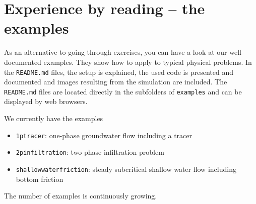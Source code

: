\section{Experience \Dumux by reading -- the \Dumux examples}
As an alternative to going through exercises, you can have a look at our well-documented \Dumux examples. They show how to apply \Dumux to typical physical problems. In the \texttt{README.md} files, the setup is explained, the used code is presented and documented and images resulting from the simulation are included. The \texttt{README.md} files are located directly in the subfolders of \texttt{examples} and can be displayed by web browsers.

We currently have the examples
\begin{itemize}
	\item \texttt{1ptracer}: one-phase groundwater flow including a tracer
	\item \texttt{2pinfiltration}: two-phase infiltration problem
	\item \texttt{shallowwaterfriction}: steady subcritical shallow water flow including bottom friction  
\end{itemize}
The number of examples is continuously growing.
